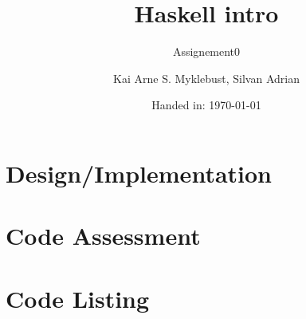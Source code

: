 \documentclass[12pt,a4paper]{article}
\begin{document}
\title{Haskell intro}
\subtitle{Assignement0}

\author{Kai Arne S. Myklebust, Silvan Adrian}
\date{Handed in: \today}
	
\maketitle
\tableofcontents

\section{Design/Implementation}


\section{Code Assessment}




\appendix
\section{Code Listing}

\inputminted{haskell}{assignement1/src/SubsInterpreter.hs}
\end{document}
